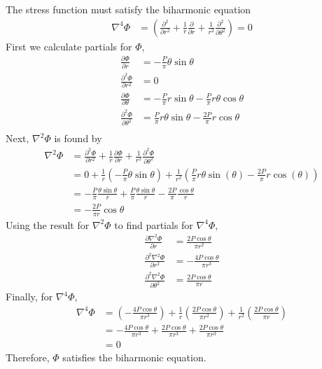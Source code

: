The stress function must satisfy the biharmonic equation
\begin{align*}
    \nabla^4 \Phi &= \left(\frac{\partial^2}{\partial r^2} + \frac{1}{r} \frac{\partial}{\partial r} + \frac{1}{r^2} \frac{\partial^2}{\partial \theta^2} \right)  = 0
\end{align*}
First we calculate partials for $\Phi$,
\begin{align*}
    \frac{\partial \Phi}{\partial r} &= -\frac{P}{\pi} \theta \sin\theta \\
    \frac{\partial^2 \Phi}{\partial r^2} &= 0 \\
    \frac{\partial \Phi}{\partial \theta} &= -\frac{P}{\pi} r \sin\theta - \frac{P}{\pi} r \theta \cos\theta \\
    \frac{\partial^2 \Phi}{\partial \theta^2} &= \frac{P}{\pi}r \theta \sin\theta - \frac{2P}{\pi}r \cos\theta \\
\end{align*}
Next, $\nabla^2 \Phi$ is found by
\begin{align*}
    \nabla^2 \Phi &= \frac{\partial^2 \Phi}{\partial r^2} + \frac{1}{r} \frac{\partial \Phi}{\partial r} + \frac{1}{r^2} \frac{\partial^2 \Phi}{\partial \theta^2}\\
    &=0 + \frac{1}{r} \left(-\frac{P}{\pi} \theta \sin\theta \right) + \frac{1}{r^2} \left(\frac{P}{\pi}r \theta \sin(\theta) 
    - \frac{2P}{\pi}r \cos(\theta) \right) \\
    &= -\frac{P}{\pi} \frac{\theta \sin\theta}{r} + \frac{P}{\pi} \frac{\theta \sin\theta}{r} - \frac{2P}{\pi} \frac{\cos\theta}{r} \\
    &= -\frac{2P}{\pi r} \cos\theta
\end{align*}
Using the result for $\nabla^2 \Phi$ to find partials for $\nabla^4 \Phi$,
\begin{align*}
    \frac{\partial \nabla^2 \Phi}{\partial r} &= \frac{2 P \cos{\theta}}{\pi r^{2}} \\
    \frac{\partial^2 \nabla^2 \Phi}{\partial r^2} &= - \frac{4 P \cos{\theta}}{\pi r^{3}} \\
    \frac{\partial^2 \nabla^2 \Phi}{\partial \theta^2} &= \frac{2 P \cos{\theta}}{\pi r} 
\end{align*}
Finally, for $\nabla^4 \Phi$,
\begin{align*}
    \nabla^4 \Phi &= \left(-\frac{4P\cos\theta}{\pi r^3} \right) + \frac{1}{r} \left(\frac{2P\cos\theta}{\pi r^2} \right) 
    + \frac{1}{r^2} \left( \frac{2P\cos\theta}{\pi r} \right) \\
    &= -\frac{4P\cos\theta}{\pi r^3} + \frac{2P\cos\theta}{\pi r^3} + \frac{2P\cos\theta}{\pi r^3} \\
    &= \boxed{0}
\end{align*}
Therefore, $\Phi$ satisfies the biharmonic equation.

